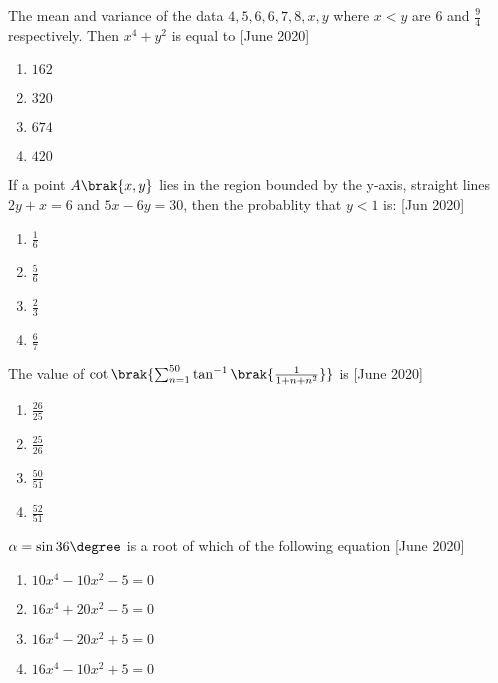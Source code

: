 \iffalse
\title{June 2022-shift 2-16-30}
\author{ai24btech11028 - Ronit Ranjan}
\section{mcq-single}
\fi 

    \item The mean and variance of the data $4, 5, 6, 6, 7, 8, x, y$ where $x < y$ are $6$ and $\frac{9}{4}$ respectively. Then $x^4 + y^2$ is equal to \hfill{[June 2020]}
    \begin{multicols}{2}
    \begin{enumerate}
        \item $162$
        \item $320$
        \item $674$
        \item $420$
    \end{enumerate}
    \end{multicols}

    \item If a point $A\brak{x, y}$ lies in the region bounded by the y-axis, straight lines $2y + x = 6$ and $5x - 6y = 30$, then the probablity that $y<1$ is: \hfill{[Jun 2020]}
    \begin{multicols}{2}
    \begin{enumerate}
        \item $\frac{1}{6}$
        \item $\frac{5}{6}$
        \item $\frac{2}{3}$
        \item $\frac{6}{7}$
    \end{enumerate}
    \end{multicols}    

    \item The value of $\cot \brak{ \sum_{n=1}^{50} \tan^{-1} \brak{ \frac{1}{1+n+n^2} }}$ is  \hfill{[June 2020]}
    \begin{multicols}{2}
    \begin{enumerate}
        \item $\frac{26}{25}$
        \item $\frac{25}{26}$
        \item $\frac{50}{51}$
        \item $\frac{52}{51}$
    \end{enumerate}
    \end{multicols}    

    \item $\alpha = \sin 36\degree$ is a root of which of the following equation \hfill{[June 2020]}
    \begin{multicols}{2}
    \begin{enumerate}
        \item $10x^4 - 10x^2 -5 = 0$
        \item $16x^4 + 20x^2 -5 = 0$
        \item $16x^4 - 20x^2 +5 = 0$
        \item $16x^4 - 10x^2 +5 = 0$
    \end{enumerate}
    \end{multicols}

